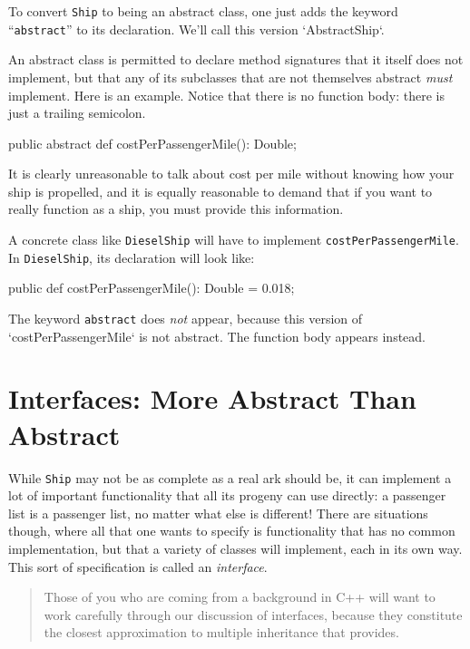 To convert {\tt Ship} to being an abstract class, one just adds the keyword
``{\tt abstract}'' to its declaration.  We'll call this version
\xcd`AbstractShip`.


\begin{xtennum}[]
abstract public class AbstractShip {
    public static DEFAULT_SIZE = 500;
    public  val name: String;
    // and all the other code as from Ship.x10
\end{xtennum}


An abstract class is permitted to declare method signatures that it itself
does not 
implement, but that any of its subclasses that
are not themselves abstract {\em must} implement.  Here is an example. 
Notice that there is no function body: there is just a trailing semicolon.
\begin{xtennum}[]
public abstract def costPerPassengerMile(): Double;
\end{xtennum}

It is clearly unreasonable to talk about cost per mile without knowing how
your ship is  propelled, and it is equally reasonable to demand that if you
want to really function as a ship, you must provide this information.


A concrete class like {\tt DieselShip}
will have to implement {\tt cost\-Per\-Passen\-ger\-Mile}.
In {\tt DieselShip}, its declaration will
look like:

\begin{xtennum}[]
public def costPerPassengerMile(): Double = 0.018;
\end{xtennum}
The keyword {\tt abstract} does {\em not} appear, because this version of
\xcd`costPerPassengerMile` is not abstract. 
The function body appears instead.

\section{Interfaces: More Abstract Than Abstract}\label{sec:mata}

While {\tt Ship} may not be as complete as a real ark should be, it can implement a
lot of important functionality that all its progeny can use directly: a passenger list is a 
passenger list, no matter what else is different!  There are situations though, where all
that one wants to specify is functionality that has no common implementation, but
that a variety of classes will implement, each in its own way.  This sort of specification
is called an {\em interface}.  
\begin{quote}
Those of you who are coming from a background in C++ will want to work carefully through
our discussion of interfaces, because they constitute the closest approximation
to multiple inheritance that \Xten{} provides.
\end{quote}

